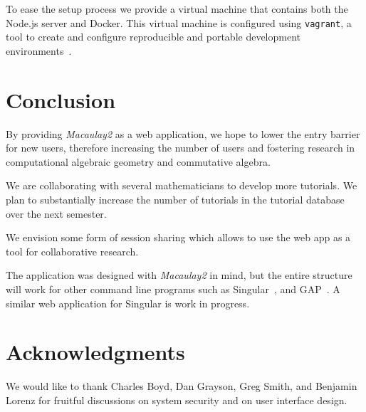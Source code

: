 \documentclass[twocolumn]{article}
\def\M2{{\it Macaulay2}}
\begin{document}
To ease the setup process we provide a virtual machine that contains both the Node.js server
and Docker. This virtual machine is configured using {\tt vagrant}, a tool to create and
configure reproducible and portable development environments~\cite{vagrant}.

\section{Conclusion}

By providing \M2 as a web application, we hope to lower the
 entry barrier for new users, therefore increasing the number 
 of users and fostering research in computational algebraic geometry and commutative algebra. 


We are collaborating with several mathematicians to develop more tutorials.
We plan to substantially increase the number of tutorials in the tutorial database over the next semester.


We envision some form of session sharing which allows to use the web app as a tool for collaborative research.


The application was designed with \M2 in mind, but
the entire structure will work for other command line programs such as Singular~\cite{singular},
and GAP~\cite{GAP4}. A similar web application for Singular is work in progress.

\section{Acknowledgments}

We would like to thank Charles Boyd, Dan Grayson, Greg Smith, and Benjamin Lorenz for
fruitful discussions on system security and on user interface design.



\end{document}
